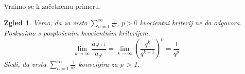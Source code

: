 \documentclass{beamer}
\newtheorem{zgled}{Zgled}
\begin{document}
\begin{frame}
    Vrnimo se k začetnemu primeru.
    \begin{zgled}
        Vemo, da za vrsto 
        $\sum_{n = 1}^{\infty}{\frac{1}{n^p}}$, $p > 0$
        kvocientni kriterij ne da odgovora.
        Poskusimo s posplošenim kvocientnim kriterijem.
        \pause
        \[
            \lim_{k \to \infty}{\frac{a_{q^{k + 1}}}{a_{q^k}}} =
            \lim_{k \to \infty}{\left( \frac{q^k}{q^{k+1}} \right)^p} = \frac{1}{q^p}
        \]
        \vspace{0.2cm}
        \pause
        Sledi, da vrsta $\sum_{n = 1}^{\infty}{\frac{1}{n^p}}$ konvergira za p > 1.

    \end{zgled}
    
\end{frame}

\end{document}
